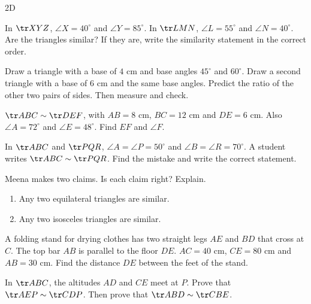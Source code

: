 \begin{exercise}{2D}
  \item In $\tr XYZ$, $\angle X=40^\circ$ and $\angle Y=85^\circ$. In $\tr LMN$, $\angle L=55^\circ$ and $\angle N=40^\circ$. Are the triangles similar? If they are, write the similarity statement in the correct order.
  \item Draw a triangle with a base of $4$ cm and base angles $45^\circ$ and $60^\circ$. Draw a second triangle with a base of $6$ cm and the same base angles. Predict the ratio of the other two pairs of sides. Then measure and check.
  \item $\tr ABC\sim\tr DEF$, with $AB=8$ cm, $BC=12$ cm and $DE=6$ cm. Also $\angle A=72^\circ$ and $\angle E=48^\circ$. Find $EF$ and $\angle F$.
  \item In $\tr ABC$ and $\tr PQR$, $\angle A=\angle P=50^\circ$ and $\angle B=\angle R=70^\circ$. A student writes $\tr ABC\sim\tr PQR$. Find the mistake and write the correct statement.
  \item Meena makes two claims. Is each claim right? Explain.
  \begin{enumerate}[label=(\alph*),itemsep=1pt]
    \item Any two equilateral triangles are similar.
    \item Any two isosceles triangles are similar.
  \end{enumerate}
  \item A folding stand for drying clothes has two straight legs $AE$ and $BD$ that cross at $C$. The top bar $AB$ is parallel to the floor $DE$. $AC=40$ cm, $CE=80$ cm and $AB=30$ cm. Find the distance $DE$ between the feet of the stand.
\begin{center}\end{center}
  \item In $\tr ABC$, the altitudes $AD$ and $CE$ meet at $P$. Prove that $\tr AEP\sim\tr CDP$. Then prove that $\tr ABD\sim\tr CBE$.

\end{exercise}
